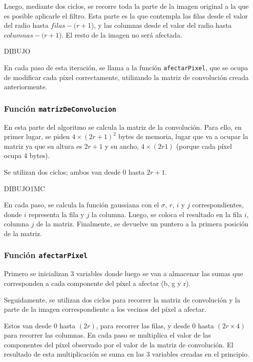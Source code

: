       Luego, mediante dos ciclos, se recorre toda la parte de la imagen original a la que es posible aplicarle el filtro. Esta parte es la que contempla las filas desde el valor del radio hasta $filas - (r + 1$), y las columnas desde el valor del radio hasta $columnas - (r + 1$). El resto de la imagen no será afectada. 

      DIBUJO

      En cada paso de esta iteración, se llama a la función \texttt{afectarPixel}, que se ocupa de modificar cada píxel correctamente, utilizando la matriz de convolución creada anteriormente. 

      \subsubsection*{Función \texttt{matrizDeConvolucion}}

        En esta parte del algoritmo se calcula la matriz de la convolución. Para ello, en primer lugar, se piden $4 \times (2r + 1)^2$ bytes de memoria, lugar que va a ocupar la matriz ya que su altura es $2r + 1$ y su ancho, $4 \times (2r 1)$ (porque cada píxel ocupa 4 bytes).
        
        Se utilizan dos ciclos; ambos van desde 0 hasta $2r + 1$. 
        
        DIBUJO1MC

        En cada paso, se calcula la función gaussiana con el $\sigma$, $r$, $i$ y $j$ correspondientes, donde $i$ representa la fila y $j$ la columna. Luego, se coloca el resultado en la fila $i$, columna $j$ de la matriz. Finalmente, se devuelve un puntero a la primera posición de la matriz.

      \subsubsection*{Función \texttt{afectarPixel}}
        Primero se inicializan 3 variables donde luego se van a almacenar las sumas que corresponden a cada componente del píxel a afectar (\textsf{b}, \textsf{g} y \textsf{r}). 

        Seguidamente, se utilizan dos ciclos para recorrer la matriz de convolución y la parte de la imagen correspondiente a los vecinos del píxel a afectar. 
        
        Estos van desde $0$ hasta $(2r)$, para recorrer las filas, y desde $0$ hasta $(2r \times 4)$ para recorrer las columnas. En cada paso se multiplica el valor de las componentes del píxel observado por el valor de la matriz de convolución. El resultado de esta multiplicación se suma en las 3 variables creadas en el principio. 
        
